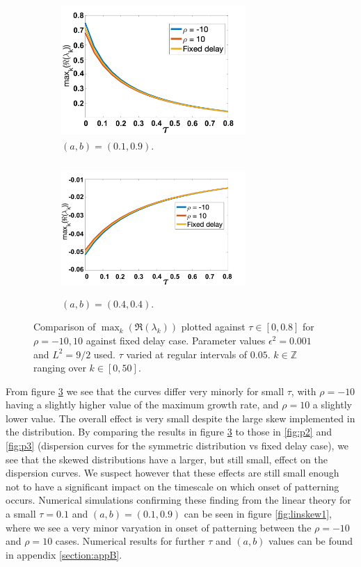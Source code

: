 \begin{figure}[H]
    \centering
    \begin{subfigure}[t]{0.45\textwidth}
        \centering
        \includegraphics[width=7cm,height=5cm]{dispskew.png}
        \caption{$(a,b)=(0.1,0.9)$.}
        \label{}
    \end{subfigure}
    \hfill
    \begin{subfigure}[t]{0.45\textwidth}
        \centering
        \includegraphics[width=7cm,height=5cm]{dispskew2.png}
        \caption{$(a,b)=(0.4,0.4)$.}
        \label{}
    \end{subfigure}
    \caption{Comparison of $\max_k(\Re(\lambda_k))$ plotted against $\tau\in[0,0.8]$ for $\rho=-10,10$ against fixed delay case. Parameter values $\epsilon^2=0.001$ and $L^2=9/2$ used. $\tau$ varied at regular intervals of $0.05$. $k\in\mathbb{Z}$ ranging over $k\in[0,50]$.}
    \label{fig:dispskew}
\end{figure}
From figure \ref{fig:dispskew} we see that the curves differ very minorly for small $\tau$, with $\rho=-10$ having a slightly higher value of the maximum growth rate, and $\rho=10$ a slightly lower value. The overall effect is very small despite the large skew implemented in the distribution. By comparing the results in figure \ref{fig:dispskew} to those in \ref{fig:p2} and \ref{fig:p3} (dispersion curves for the symmetric distribution vs fixed delay case), we see that the skewed distributions have a larger, but still small, effect on the dispersion curves. We suspect however that these effects are still small enough not to have a significant impact on the timescale on which onset of patterning occurs. Numerical simulations confirming these finding from the linear theory for a small $\tau=0.1$ and $(a,b)=(0.1,0.9)$ can be seen in figure \ref{fig:linskew1}, where we see a very minor varyation in onset of patterning between the $\rho=-10$ and $\rho=10$ cases. Numerical results for further $\tau$ and $(a,b)$ values can be found in appendix \ref{section:appB}.

